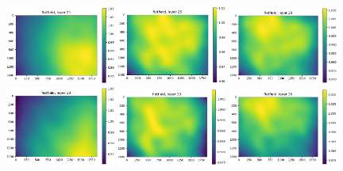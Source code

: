 \documentclass[letterpaper,11pt]{article}
\begin{document}
\begin{figure}[!ht]
\centering
\includegraphics[width=0.32\textwidth]{images/results/flatfield_layers_polaris/flatfield_layer_21}
\includegraphics[width=0.32\textwidth]{images/results/flatfield_layers_polaris/flatfield_layer_25}
\includegraphics[width=0.32\textwidth]{images/results/flatfield_layers_polaris/flatfield_layer_29}
\includegraphics[width=0.32\textwidth]{images/results/flatfield_layers_polaris/flatfield_layer_30}
\includegraphics[width=0.32\textwidth]{images/results/flatfield_layers_polaris/flatfield_layer_33}
\includegraphics[width=0.32\textwidth]{images/results/flatfield_layers_polaris/flatfield_layer_36}

\end{figure}
\end{document}
